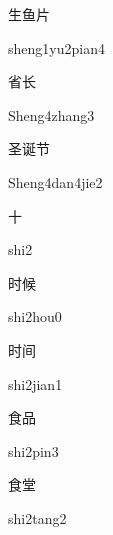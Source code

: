 \begin{multicols*}{2}
\begin{verbete}{生鱼片}
\begin{pronuncia}{sheng1yu2pian4}
\end{pronuncia}
\end{verbete}

\begin{verbete}{省长}
\begin{pronuncia}{Sheng4zhang3}
\end{pronuncia}
\end{verbete}

\begin{verbete}{圣诞节}
\begin{pronuncia}{Sheng4dan4jie2}
\end{pronuncia}
\end{verbete}

\begin{verbete}[shi2]{十}
\begin{pronuncia}{shi2}
\end{pronuncia}
\end{verbete}

\begin{verbete}{时候}
\begin{pronuncia}{shi2hou0}
\end{pronuncia}
\end{verbete}

\begin{verbete}{时间}
\begin{pronuncia}{shi2jian1}
\end{pronuncia}
\end{verbete}

\begin{verbete}{食品}
\begin{pronuncia}{shi2pin3}
\end{pronuncia}
\end{verbete}

\begin{verbete}{食堂}
\begin{pronuncia}{shi2tang2}
\end{pronuncia}
\end{verbete}


\end{multicols*}
